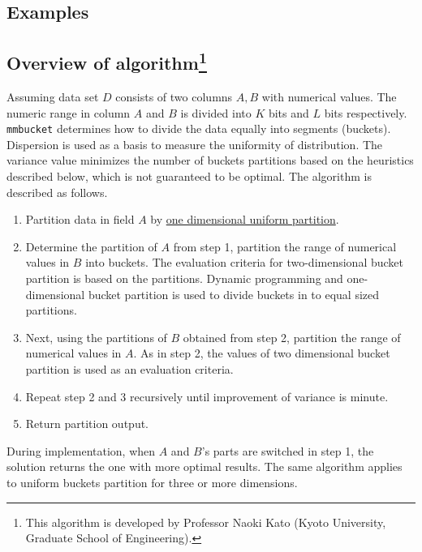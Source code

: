 \subsection*{Examples}

\subsection*{Overview of algorithm\footnote{This algorithm is developed by Professor Naoki Kato (Kyoto University, Graduate School of Engineering).}}

Assuming data set $D$ consists of two columns $A,B$ with numerical values. The numeric range in column $A$ and $B$ is divided into $K$ bits and $L$ bits respectively. \verb|mmbucket| determines how to divide the data equally into segments (buckets). Dispersion is used as a basis to measure the uniformity of distribution.  The variance value minimizes the number of buckets partitions based on the heuristics described below, which is not guaranteed to be optimal. The algorithm is described as follows. \\

\begin{enumerate}
\item Partition data in field $A$ by \hyperref[sect:mbucket]{one dimensional uniform partition}. \\
\item Determine the partition of $A$ from step 1, partition the range of numerical values in $B$ into buckets. The evaluation criteria for two-dimensional bucket partition is based on the partitions. Dynamic programming and one-dimensional bucket partition is used to divide buckets in to equal sized partitions.\\
\item Next, using the partitions of $B$ obtained from step 2, partition the range of numerical values in $A$. As in step 2, the values of two dimensional bucket partition is used as an evaluation criteria. \\
\item Repeat step 2 and 3 recursively until improvement of variance is minute.\\
\item Return partition output. \\
\end{enumerate}

During implementation, when $A$ and $B$’s parts are switched in step 1, the solution returns the one with more optimal results. The same algorithm applies to uniform buckets partition for three or more dimensions.


